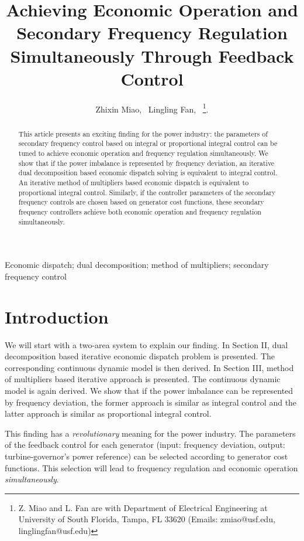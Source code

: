 \documentclass[10pt, journal, final, twocolumns]{IEEEtran}
\begin{document}
\title{Achieving Economic Operation and Secondary Frequency Regulation Simultaneously Through Feedback Control}


\author{Zhixin Miao,~
Lingling Fan,~
\thanks{Z. Miao and L. Fan are with Department of Electrical Engineering at University of South Florida, Tampa, FL 33620 (Emails: zmiao@usf.edu, linglingfan@usf.edu)}.}
\maketitle
\begin{abstract}
This article presents an exciting finding for the power industry: the parameters of secondary frequency control based on integral or proportional integral control can be tuned to achieve economic operation and frequency regulation simultaneously.  We show that if the power imbalance is represented by frequency deviation, an iterative dual decomposition based economic dispatch solving is equivalent to integral control. An iterative method of multipliers based economic dispatch is equivalent to proportional integral control. Similarly, if the controller parameters of the secondary frequency controls are chosen based on generator cost functions, these secondary frequency controllers achieve both economic operation and frequency regulation simultaneously.
\end{abstract}

\begin{IEEEkeywords}
Economic dispatch; dual decomposition; method of multipliers; secondary frequency control
\end{IEEEkeywords}

\section{Introduction}
We will start with a two-area system to explain our finding. In Section II, dual decomposition based iterative economic dispatch problem is presented. The corresponding continuous dynamic model is then derived. In Section III, method of multipliers based iterative approach is presented. The continuous dynamic model is again derived. We show that if the power imbalance can be represented by frequency deviation, the former approach is similar as integral control and the latter approach is similar as proportional integral control.

This finding has a \emph{revolutionary} meaning for the power industry. The parameters of the feedback control for each generator (input: frequency deviation, output: turbine-governor's power reference) can be selected according to generator cost functions. This selection will lead to frequency regulation and economic operation \emph{simultaneously}.
\end{document}
